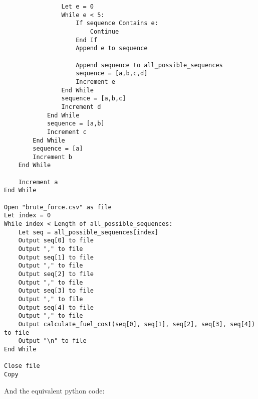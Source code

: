 \documentclass[
]{article}
\begin{document}
\begin{verbatim}
                Let e = 0
                While e < 5:
                    If sequence Contains e:
                        Continue
                    End If
                    Append e to sequence

                    Append sequence to all_possible_sequences
                    sequence = [a,b,c,d]
                    Increment e
                End While
                sequence = [a,b,c]
                Increment d
            End While
            sequence = [a,b]
            Increment c
        End While
        sequence = [a]
        Increment b
    End While

    Increment a
End While

Open "brute_force.csv" as file
Let index = 0
While index < Length of all_possible_sequences:
    Let seq = all_possible_sequences[index]
    Output seq[0] to file
    Output "," to file
    Output seq[1] to file
    Output "," to file
    Output seq[2] to file
    Output "," to file
    Output seq[3] to file
    Output "," to file
    Output seq[4] to file
    Output "," to file
    Output calculate_fuel_cost(seq[0], seq[1], seq[2], seq[3], seq[4]) to file
    Output "\n" to file
End While

Close file
Copy
\end{verbatim}

And the equivalent python code:
\end{document}
